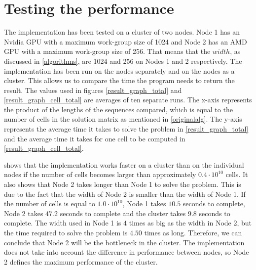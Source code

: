 \begin{figure*}[htb]
    \centering
    \subfloat[][Overview]{\label{result_graph}}%
    \subfloat[][Zoomed in]{\label{result_graph_zoom}}
    \caption{Average time to compute edit distance} \label{result_graph_total}
\end{figure*}

\begin{figure*}[htb]
    \centering
    \subfloat[][Overview]{\label{result_graph_cell}}%
    \subfloat[][Zoomed in]{\label{result_graph_cell_zoom}}
    \caption{Average time per cell} \label{result_graph_cell_total}
\end{figure*}

\section{Testing the performance} \label{testing}
The implementation has been tested on a cluster of two nodes.
Node 1 has an Nvidia GPU with a maximum work-group size of 1024 and Node 2 has an AMD GPU with a maximum work-group size of 256. 
That means that the $width$, as discussed in \cref{algorithms}, are 1024 and 256 on Nodes 1 and 2 respectively.
The implementation has been run on the nodes separately and on the nodes as a cluster.
This allows us to compare the time the program needs to return the result.
The values used in figures \ref{result_graph_total} and \ref{result_graph_cell_total} are averages of ten separate runs.
The x-axis represents the product of the lengths of the sequences compared, which is equal to the number of cells in the solution matrix as mentioned in \cref{originalalg}.
The y-axis represents the average time it takes to solve the problem in \cref{result_graph_total} and the average time it takes for one cell to be computed in \cref{result_graph_cell_total}.

 shows that the implementation works faster on a cluster than on the individual nodes if the number of cells becomes larger than approximately $0.4 \cdot 10^{10}$ cells.
It also shows that Node 2 takes longer than Node 1 to solve the problem.
This is due to the fact that the width of Node 2 is smaller than the width of Node 1.
If the number of cells is equal to $1.0 \cdot 10^{10}$, Node 1 takes $10.5$ seconds to complete, Node 2 takes $47.2$ seconds to complete and the cluster takes $9.8$ seconds to complete.
The width used in Node 1 is $4$ times as big as the width in Node 2, but the time required to solve the problem is $4.50$ times as long.
Therefore, we can conclude that Node 2 will be the bottleneck in the cluster.
The implementation does not take into account the difference in performance between nodes, so Node 2 defines the maximum performance of the cluster.

